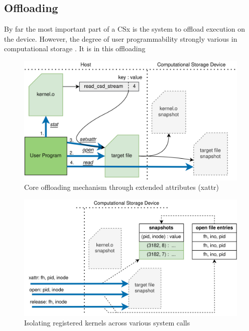 \subsection{Offloading}

By far the most important part of a CSx is the system to offload execution on
the device. However, the degree of user programmability strongly various in
computational storage \cite{lukken2021past}. It is in this offloading 


\begin{figure}
    \centering
	\includegraphics[width=1\textwidth]{resources/images/offloading.png}
	\caption{Core offloading mechanism through extended attributes (xattr)}
    \label{figure:offloading}
\end{figure}


\begin{figure}
    \centering
	\includegraphics[width=1\textwidth]{resources/images/offloading-management.png}
	\caption{Isolating registered kernels across various system calls}
    \label{figure:offloadingmanagement}
\end{figure}


